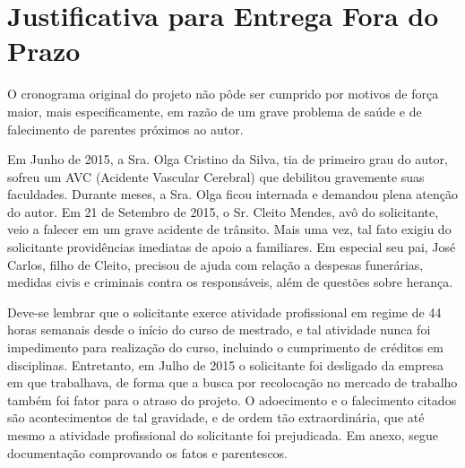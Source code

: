 \section{Justificativa para Entrega Fora do Prazo}

O cronograma original do projeto não pôde ser cumprido por motivos de força
maior, mais especificamente, em razão de um grave problema de saúde e de
falecimento de parentes próximos ao autor.

Em Junho de 2015, a Sra. Olga Cristino da Silva, tia de primeiro grau do
autor, sofreu um AVC (Acidente Vascular Cerebral) que debilitou gravemente suas
faculdades. Durante meses, a Sra. Olga ficou internada e demandou plena atenção
do autor. Em 21 de Setembro de 2015, o Sr. Cleito Mendes, avô do solicitante,
veio a falecer em um grave acidente de trânsito. Mais uma vez, tal fato exigiu
do solicitante providências imediatas de apoio a familiares. Em especial seu
pai, José Carlos, filho de Cleito, precisou de ajuda com relação a despesas
funerárias, medidas civis e criminais contra os responsáveis, além de questões
sobre herança.

Deve-se lembrar que o solicitante exerce atividade profissional em regime de 44
horas semanais desde o início do curso de mestrado, e tal atividade nunca foi
impedimento para realização do curso, incluindo o cumprimento de créditos em
disciplinas. Entretanto, em Julho de 2015 o solicitante foi desligado da empresa
em que trabalhava, de forma que a busca por recolocação no mercado de trabalho
também foi fator para o atraso do projeto. O adoecimento e o falecimento citados
são acontecimentos de tal gravidade, e de ordem tão extraordinária, que até
mesmo a atividade profissional do solicitante foi prejudicada. Em anexo, segue
documentação comprovando os fatos e parentescos.